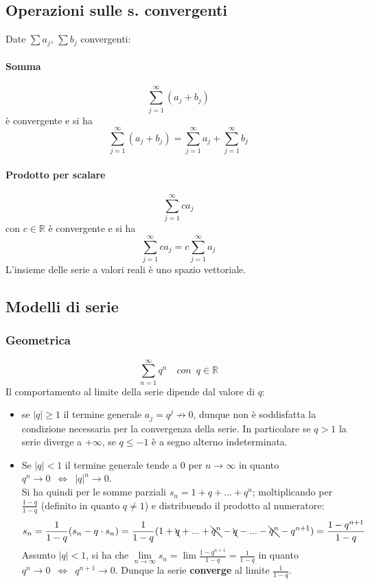 \documentclass[10pt]{article}
\theoremstyle{plain}
\begin{document}
\subsection{Operazioni sulle s. convergenti}
Date $\sum a_j$, $\sum b_j$ convergenti:
\paragraph*{Somma}
\[\sum \limits_{j = 1}^{\infty} (a_j + b_j)\]
è convergente e si ha 
\[\sum \limits_{j = 1}^{\infty} (a_j + b_j) = \sum \limits_{j = 1}^{\infty} a_j + \sum \limits_{j = 1}^{\infty} b_j\]
\paragraph{Prodotto per scalare}
\[\sum \limits_{j = 1}^{\infty} c a_j\]
con $c \in \mathbb{R}$ è convergente e si ha
\[\sum \limits_{j = 1}^{\infty} c a_j = c \sum \limits_{j = 1}^{\infty} a_j\]
L'insieme delle serie a valori reali è uno spazio vettoriale.

\subsection{Modelli di serie}

\subsubsection{Geometrica}
\[\sum \limits_{n=1}^{\infty} q^n \quad con \enspace q \in \mathbb{R}\]
Il comportamento al limite della serie dipende dal valore di $q$:
\begin{itemize}[label=$\ast$]
    \item se $|q| \geq 1$ il termine generale $a_j = q^j \nrightarrow 0$, dunque non è soddisfatta la condizione necessaria per la convergenza della serie.
    In particolare se $q > 1$ la serie diverge a $+ \infty$, se $q \leq -1$ è a segno alterno indeterminata.
    \item Se $|q| < 1$ il termine generale tende a 0 per $n \rightarrow \infty$ in quanto $q^n \rightarrow 0 \enspace \Leftrightarrow \enspace |q|^n \rightarrow 0$.
    \\Si ha quindi per le somme parziali $s_n = 1 + q + ... + q^n$; moltiplicando per $\frac{1 - q}{1 - q}$ (definito in quanto $q \neq 1$) e distribuendo il prodotto al numeratore:
    \[s_n = \frac{1}{1 -q} (s_n - q \cdot s_n) = \frac{1}{1 -q} (1 + \bcancel{q} + ... + \bcancel{q^n} - \bcancel{q} - ... - \bcancel{q^{n}} - q^{n+1}) = \frac{1 - q^{n+1}}{1 - q}\]
    Assunto $|q| < 1$, si ha che $\lim \limits_{n \rightarrow \infty} s_n = \lim \frac{1 - q^{n+1}}{1 - q} = \frac{1}{1 - q}$ in quanto $q^n \rightarrow 0 \enspace \Leftrightarrow \enspace q^{n+1} \rightarrow 0$. Dunque la serie \textbf{converge} al limite $\frac{1}{1-q}$.
\end{itemize}
\end{document}
